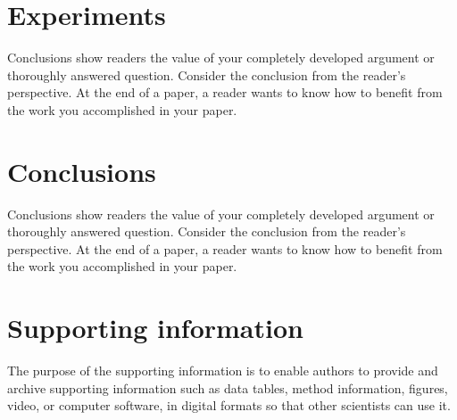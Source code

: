 \documentclass[11pt, a4paper]{article}
\begin{document}
\section{Experiments}\label{sec:conc} 
Conclusions show readers the value of your completely developed argument or thoroughly answered question. Consider the conclusion from the reader's perspective. At the end of a paper, a reader wants to know how to benefit from the work you accomplished in your paper. 

\section{Conclusions}
Conclusions show readers the value of your completely developed argument or thoroughly answered question. Consider the conclusion from the reader's perspective. At the end of a paper, a reader wants to know how to benefit from the work you accomplished in your paper. 

\appendix
\section{Supporting information}
The purpose of the supporting information is to enable authors to provide and archive supporting information such as data tables, method information, figures, video, or computer software, in digital formats so that other scientists can use it.

\small \singlespacing
 

\end{document}
